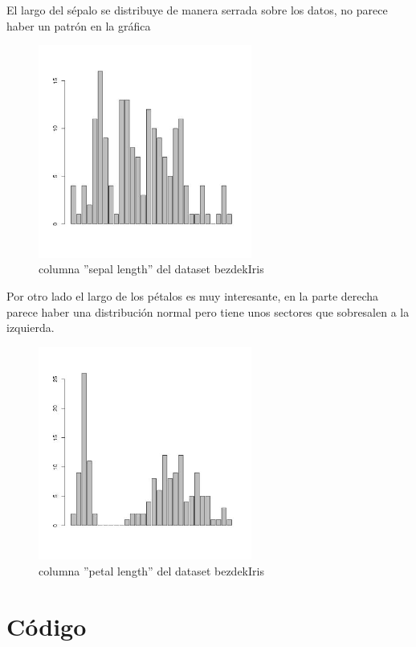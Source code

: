 \documentclass[10pt]{article}
\begin{document}
El largo del sépalo se distribuye de manera serrada sobre los datos, no parece haber un patrón en la gráfica

\begin{figure}[htbp]
\centering
\includegraphics[width=7cm]{img/iris0.jpeg}
\caption{columna ''sepal length'' del dataset bezdekIris}
\end{figure}

Por otro lado el largo de los pétalos es muy interesante, en la parte derecha parece haber una distribución normal pero tiene unos sectores que sobresalen a la izquierda.

\begin{figure}[htbp]
\centering
\includegraphics[width=7cm]{img/iris1.jpeg}
\caption{columna ''petal length'' del dataset bezdekIris}
\end{figure}

\pagebreak

\section*{Código}
\label{sec:org61880de}

\end{document}
